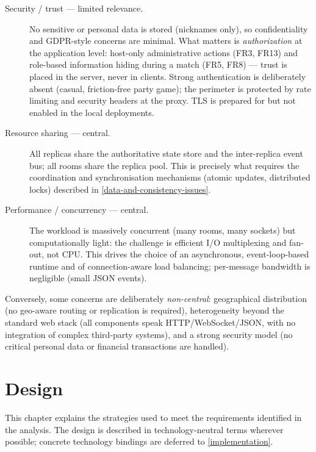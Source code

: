 \documentclass{scrartcl}
\begin{document}
\begin{description}
      \item[Security / trust --- limited relevance.] No sensitive or personal data
            is stored (nicknames only), so confidentiality and GDPR-style concerns are
            minimal. What matters is \emph{authorization} at the application level:
            host-only administrative actions (FR3, FR13) and role-based information hiding
            during a match (FR5, FR8) --- trust is placed in the server, never in clients.
            Strong authentication is deliberately absent (casual, friction-free party
            game); the perimeter is protected by rate limiting and security headers at the
            proxy. TLS is prepared for but not enabled in the local deployments.

      \item[Resource sharing --- central.] All replicas share the authoritative
            state store and the inter-replica event bus; all rooms share the replica pool.
            This is precisely what requires the coordination and synchronisation
            mechanisms (atomic updates, distributed locks) described in
            \cref{data-and-consistency-issues}.

      \item[Performance / concurrency --- central.] The workload is massively
            concurrent (many rooms, many sockets) but computationally light: the challenge
            is efficient I/O multiplexing and fan-out, not CPU. This drives the choice of
            an asynchronous, event-loop-based runtime and of connection-aware load
            balancing; per-message bandwidth is negligible (small JSON events).
\end{description}

Conversely, some concerns are deliberately \emph{non-central}: geographical
distribution (no geo-aware routing or replication is required), heterogeneity
beyond the standard web stack (all components speak HTTP/WebSocket/JSON, with no
integration of complex third-party systems), and a strong security model (no
critical personal data or financial transactions are handled).

\section{Design}\label{design}

This chapter explains the strategies used to meet the requirements identified in
the analysis. The design is described in technology-neutral terms wherever
possible; concrete technology bindings are deferred to \cref{implementation}.
\end{document}

